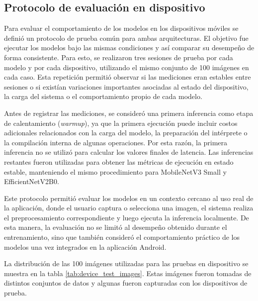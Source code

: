\subsection{Protocolo de evaluación en dispositivo}

Para evaluar el comportamiento de los modelos en los dispositivos móviles se definió un protocolo de prueba común para ambas
arquitecturas. El objetivo fue ejecutar los modelos bajo las mismas condiciones y así comparar su desempeño de forma consistente. Para
esto, se realizaron tres sesiones de prueba por cada modelo y por cada dispositivo, utilizando el mismo conjunto de 100 imágenes en cada
caso. Esta repetición permitió observar si las mediciones eran estables entre sesiones o si existían variaciones importantes asociadas al
estado del dispositivo, la carga del sistema o el comportamiento propio de cada modelo.

Antes de registrar las mediciones, se consideró una primera inferencia como etapa de calentamiento (\textit{warmup}), ya que la primera
ejecución puede incluir costos adicionales relacionados con la carga del modelo, la preparación del intérprete o la compilación interna
de algunas operaciones. Por esta razón, la primera inferencia no se utilizó para calcular los valores finales de latencia. Las inferencias
restantes fueron utilizadas para obtener las métricas de ejecución en estado estable, manteniendo el mismo procedimiento para MobileNetV3
Small y EfficientNetV2B0.

Este protocolo permitió evaluar los modelos en un contexto cercano al uso real de la aplicación, donde el usuario captura o selecciona
una imagen, el sistema realiza el preprocesamiento correspondiente y luego ejecuta la inferencia localmente. De esta manera, la evaluación
no se limitó al desempeño obtenido durante el entrenamiento, sino que también consideró el comportamiento práctico de los modelos una vez
integrados en la aplicación Android.

La distribución de las 100 imágenes utilizadas para las pruebas en dispositivo se muestra en la tabla \ref{tab:device_test_images}.
Estas imágenes fueron tomadas de distintos conjuntos de datos y algunas fueron capturadas con los dispositivos de prueba.

